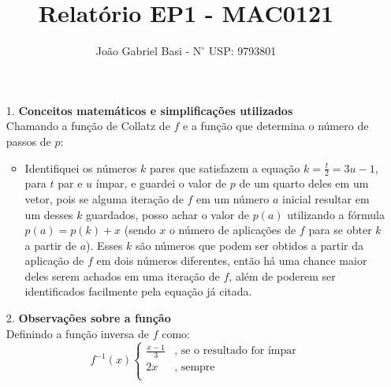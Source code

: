 \documentclass[12pt, a4paper]{article} %
\title{Relatório EP1 - MAC0121}
\date{}
\author{João Gabriel Basi - $\text{N}^\circ$ USP: 9793801}
\begin{document}
\maketitle
\begin{enumerate}
\large
\item[1.]\textbf{Conceitos matemáticos e simplificações utilizados}
\normalsize\\
Chamando a função de Collatz de $f$ e a função que determina o número de passos de $p$:
\begin{itemize}
\item Identifiquei os números $k$ pares que satisfazem a equação $k=\frac{t}{2}=3u-1$, para $t$ par e $u$ ímpar, e guardei o valor de $p$ de um quarto deles em um vetor, pois se alguma iteração de $f$ em um número $a$ inicial resultar em um desses $k$ guardados, posso achar o valor de $p(a)$ utilizando a fórmula $p(a) =p(k)+x$ (sendo $x$ o número de aplicações de $f$ para se obter $k$ a partir de $a$). Esses $k$ são números que podem ser obtidos a partir da aplicação de $f$ em dois números diferentes, então há uma chance maior deles serem achados em uma iteração de $f$, além de poderem ser identificados facilmente pela equação já citada.
\end{itemize}
\large
\item[2.]\textbf{Observações sobre a função}
\normalsize\\
Definindo a função inversa de $f$ como:
$$f^{-1}(x)\left\{
\begin{array}{ll}
      \frac{x-1}{3} & \text{, se o resultado for ímpar}\\
      2x & \text{, sempre}\\
\end{array} 
\right.
$$
\begin{itemize}

\end{itemize}
\end{enumerate}
\end{document}
